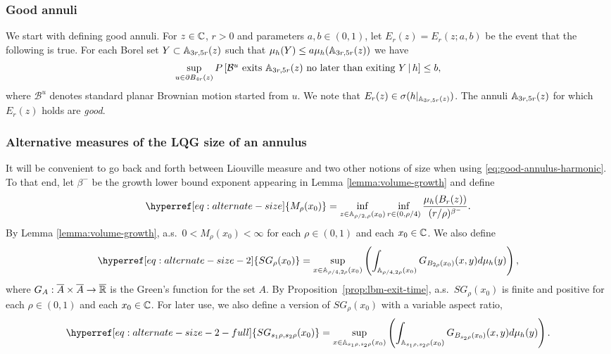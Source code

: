 \documentclass[12pt]{amsart}
\numberwithin{equation}{section}
\newcommand{\Mrho}[2]{\hyperref[eq:alternate-size]{M_{#1}(#2)}}
\newcommand{\SGrho}[2]{\hyperref[eq:alternate-size-2]{SG_{#1}(#2)}}
\newcommand{\SGrhofull}[4]{\hyperref[eq:alternate-size-2-full]{SG_{#3 #1, #4 #1}(#2)}}
\begin{document}
	\subsubsection{Good annuli}
	We start with defining good annuli. For $z \in \mathbb{C}$, $r > 0$ and parameters $a,b \in (0,1)$,
	let $E_r(z) = E_r(z; a,b)$ be the event that the following is true. For each Borel set $Y \subset \mathbb{A}_{3r, 5r}(z)$
	such that $\mu_h(Y) \leq a \mu_h(\mathbb{A}_{3 r, 5r}(z))$ we have 
	\begin{equation} \label{eq:good-annulus-harmonic} %
	\sup_{u \in \partial B_{4 r}(z)} P\left[ \mbox{$\mathcal{B}^u$ exits $\A_{3 r, 5 r}(z)$ no later than exiting $Y$}  \, |\, h  \right] \leq b ,
	\end{equation}
	where $\mathcal B^u$ denotes standard planar Brownian motion started from $u$. 
	We note that $E_r(z) \in \sigma(h |_{\mathbb{A}_{3r,5r}(z)})$.
	The annuli $\mathbb{A}_{3 r, 5r}(z)$ for which $E_r(z)$ holds are {\it good}.
	
	\subsubsection{Alternative measures of the LQG size of an annulus}
	It will be convenient to go back and forth between Liouville measure and two other notions of size when using 
	\eqref{eq:good-annulus-harmonic}.  To that end, let $\beta^-$ be the growth lower bound exponent appearing in Lemma \ref{lemma:volume-growth} and define 
	\begin{equation} \label{eq:alternate-size}
	\Mrho{\rho}{x_0} = \inf_{z \in \A_{\rho/2, \rho}(x_0)} \inf_{r \in (0, \rho/4)} \frac{ \mu_h(B_r(z))}{ (r/\rho)^{\beta^-}} .
	\end{equation}
	By Lemma \ref{lemma:volume-growth}, a.s.\ $0 < \Mrho{\rho}{x_0} < \infty$ for each $\rho \in (0,1)$ and each $x_0 \in \mathbb{C}$. 
	We also define
	\begin{equation} \label{eq:alternate-size-2}
	\SGrho{\rho}{x_0} = \sup_{x \in \A_{\rho/4, 2 \rho}(x_0)} \left( \int_{\A_{\rho/4, 2 \rho}(x_0)} G_{B_{2 \rho}(x_0)}(x, y) d \mu_h(y) \right),
	\end{equation}
	where $G_{A}: \overline{A} \times \overline{A} \to \overline {\mathbb{R}}$ is the Green's function for the set $A$. 
	By Proposition~\ref{prop:lbm-exit-time}, a.s.\ $\SGrho{\rho}{x_0}$ is finite and positive for each $\rho\in (0,1)$ and each $x_0 \in \mathbb{C}$. 
	For later use, we also define a version of  $\SGrho{\rho}{x_0}$ with a variable aspect ratio,
	\begin{equation} \label{eq:alternate-size-2-full}
	\SGrhofull{\rho}{x_0}{s_1}{s_2} = \sup_{x \in \A_{s_1 \rho , s_2 \rho}(x_0)} \left( \int_{\A_{s_1 \rho, s_2 \rho}(x_0)} G_{B_{s_2 \rho}(x_0)}(x, y) d \mu_h(y) \right).
	\end{equation}
	
\end{document}
